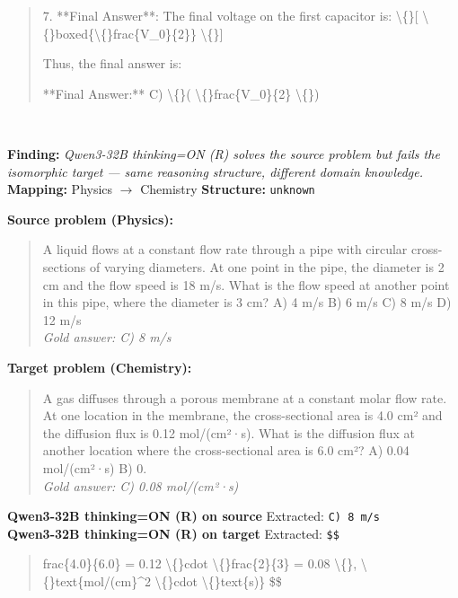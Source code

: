 \begin{tcolorbox}[
  colback=gray!5, colframe=gray!40,
  title={\textbf{Example 3: Reasoning Mode Helps (Source Domain Only)}},
  fonttitle=\small\bfseries, breakable]
\begin{quote}
7. **Final Answer**: The final voltage on the first capacitor is:
   \textbackslash\{\}[
   \textbackslash\{\}boxed\{\textbackslash\{\}frac\{V\_0\}\{2\}\}
   \textbackslash\{\}]

Thus, the final answer is:

**Final Answer:** C) \textbackslash\{\}( \textbackslash\{\}frac\{V\_0\}\{2\} \textbackslash\{\})\end{quote}
\\[-2pt]
\end{tcolorbox}
\vspace{8pt}
\begin{tcolorbox}[
  colback=gray!5, colframe=gray!40,
  title={\textbf{Example 4: Knowledge-Dependent Gain}},
  fonttitle=\small\bfseries, breakable]

\textbf{Finding:} \textit{Qwen3-32B thinking=ON (R) solves the source problem but fails the isomorphic target — same reasoning structure, different domain knowledge.}
\\[4pt]
\textbf{Mapping:} Physics $\to$ Chemistry \quad
\textbf{Structure:} \texttt{unknown}

\vspace{6pt}
\textbf{Source problem (Physics):}\\
\begin{quote}\small A liquid flows at a constant flow rate through a pipe with circular cross-sections of varying diameters. At one point in the pipe, the diameter is 2 cm and the flow speed is 18 m/s. What is the flow speed at another point in this pipe, where the diameter is 3 cm?
A) 4 m/s
B) 6 m/s
C) 8 m/s
D) 12 m/s\\
\textit{Gold answer: C) 8 m/s}\end{quote}

\textbf{Target problem (Chemistry):}\\
\begin{quote}\small A gas diffuses through a porous membrane at a constant molar flow rate. At one location in the membrane, the cross-sectional area is 4.0 cm² and the diffusion flux is 0.12 mol/(cm²·s). What is the diffusion flux at another location where the cross-sectional area is 6.0 cm²?
A) 0.04 mol/(cm²·s)
B) 0.\\
\textit{Gold answer: C) 0.08 mol/(cm²·s)}\end{quote}

\vspace{4pt}
\textbf{Qwen3-32B thinking=ON (R) on source} \textcolor{darkgreen}{\cmark} Extracted: \texttt{C) 8 m/s}
\\[-2pt]
\textbf{Qwen3-32B thinking=ON (R) on target} \textcolor{red}{\xmark} Extracted: \texttt{\$\$}
\begin{quote}\scriptsize\ttfamily [...] frac\{4.0\}\{6.0\} = 0.12 \textbackslash\{\}cdot \textbackslash\{\}frac\{2\}\{3\} = 0.08 \textbackslash\{\}, \textbackslash\{\}text\{mol/(cm\}\textasciicircum{}2 \textbackslash\{\}cdot \textbackslash\{\}text\{s)\}
\$\$


\end{quote}
\end{tcolorbox}
